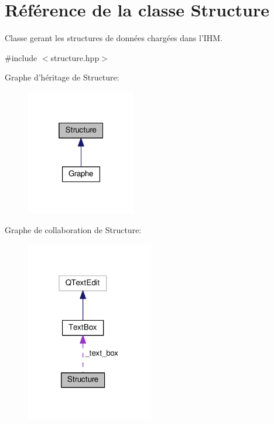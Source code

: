 \hypertarget{classStructure}{\section{Référence de la classe Structure}
\label{classStructure}
}


Classe gerant les structures de données chargées dans l'I\+H\+M.  




{\ttfamily \#include $<$structure.\+hpp$>$}



Graphe d'héritage de Structure\+:\nopagebreak
\begin{figure}[H]
\begin{center}
\leavevmode
\includegraphics[width=136pt]{classStructure__inherit__graph}
\end{center}
\end{figure}


Graphe de collaboration de Structure\+:\nopagebreak
\begin{figure}[H]
\begin{center}
\leavevmode
\includegraphics[width=157pt]{classStructure__coll__graph}
\end{center}
\end{figure}

